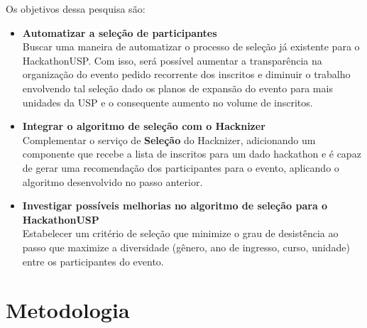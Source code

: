 \documentclass[10pt,twoside,a4paper]{article}
\begin{document}
    Os objetivos dessa pesquisa são:
    \begin{itemize}
        \item \textbf{Automatizar a seleção de participantes}\\
          Buscar uma maneira de automatizar o processo de seleção já existente para o HackathonUSP. Com isso, será possível aumentar a transparência na organização do evento \textemdash \space pedido recorrente dos inscritos \textemdash \space e diminuir o trabalho envolvendo tal seleção \textemdash  \space dado os planos de expansão do evento para mais unidades da USP e o consequente aumento no volume de inscritos.
        
        \item \textbf{Integrar o algoritmo de seleção com o Hacknizer}\\
          Complementar o serviço de \textbf{Seleção} do Hacknizer, adicionando um componente que recebe a lista de inscritos para um dado hackathon e é capaz de gerar uma recomendação dos participantes para o evento, aplicando o algoritmo desenvolvido no passo anterior.
        
        \item \textbf{Investigar possíveis melhorias no algoritmo de seleção para o HackathonUSP}\\
          Estabelecer um critério de seleção que minimize o grau de desistência ao passo que maximize a diversidade (gênero, ano de ingresso, curso, unidade) entre os participantes do evento.
    \end{itemize}
    
    
\section{Metodologia}
      
\end{document}

